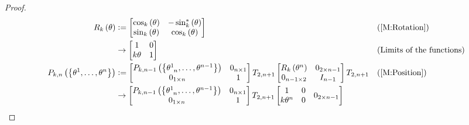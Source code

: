 \documentclass[stu, babel, american, biblatex, a4paper, leqno, draftall]{apa7}
\begin{document}
\begin{proof}
    \begin{align*}
        R_k\left(\theta\right)
        &\defeq\begin{bmatrix}
            \cos_k\left(\theta\right) & -\sin_k^\ast\left(\theta\right) \\
            \sin_k\left(\theta\right) & \cos_k\left(\theta\right) \\
        \end{bmatrix} && \text{(\cref{M:Rotation})} \\
        &\to\begin{bmatrix}
            1 & 0 \\
            k\theta & 1 \\
        \end{bmatrix} && \text{(Limits of the functions)} \\
        P_{k,n}\left(\left\{\tensor{\theta}{^1},\dots,\tensor{\theta}{^n}\right\}\right)
        &\defeq
        \begin{bmatrix}
            P_{k,n-1}\left(\left\{\tensor{\theta}{^1_{n}},\dots,\tensor{\theta}{^{n-1}}\right\}\right) & 0_{n\times 1} \\
            0_{1\times n}                                                                              & 1             \\
        \end{bmatrix}
        T_{2,n+1}
        \begin{bmatrix}
            R_k\left(\tensor{\theta}{^n}\right) & 0_{{2}\times{n-1}} \\
            0_{{n-1}\times{2}}                  & {I}_{n-1}          \\
        \end{bmatrix}
        T_{2,n+1} && \text{(\cref{M:Position})} \\
        &\to
        \begin{bmatrix}
            P_{k,n-1}\left(\left\{\tensor{\theta}{^1_{n}},\dots,\tensor{\theta}{^{n-1}}\right\}\right) & 0_{n\times 1} \\
            0_{1\times n}                                                                              & 1             \\
        \end{bmatrix}
        T_{2,n+1}
        \begin{bmatrix}
            \begin{matrix*}1&0\\k\tensor{\theta}{^n}&0\\\end{matrix*} & 0_{{2}\times{n-1}} \\

\end{bmatrix}
\end{align*}
\end{proof}
\end{document}
